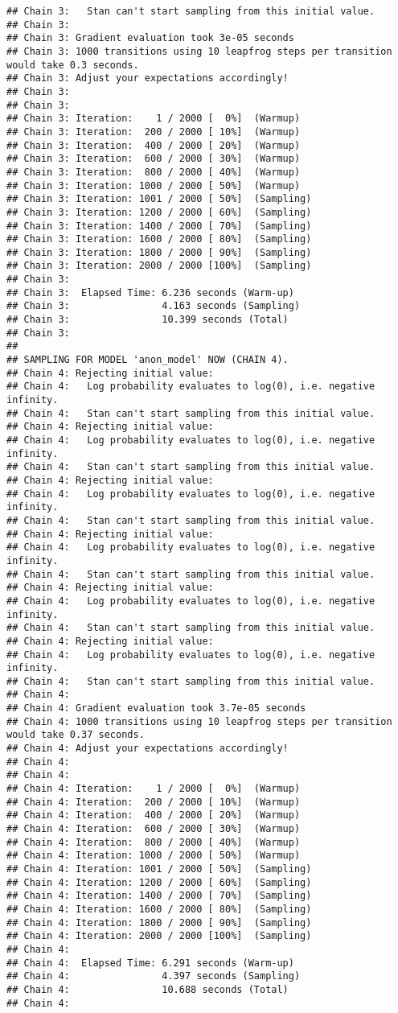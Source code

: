 \documentclass[
]{article}
\begin{document}
\begin{verbatim}
## Chain 3:   Stan can't start sampling from this initial value.
## Chain 3: 
## Chain 3: Gradient evaluation took 3e-05 seconds
## Chain 3: 1000 transitions using 10 leapfrog steps per transition would take 0.3 seconds.
## Chain 3: Adjust your expectations accordingly!
## Chain 3: 
## Chain 3: 
## Chain 3: Iteration:    1 / 2000 [  0%]  (Warmup)
## Chain 3: Iteration:  200 / 2000 [ 10%]  (Warmup)
## Chain 3: Iteration:  400 / 2000 [ 20%]  (Warmup)
## Chain 3: Iteration:  600 / 2000 [ 30%]  (Warmup)
## Chain 3: Iteration:  800 / 2000 [ 40%]  (Warmup)
## Chain 3: Iteration: 1000 / 2000 [ 50%]  (Warmup)
## Chain 3: Iteration: 1001 / 2000 [ 50%]  (Sampling)
## Chain 3: Iteration: 1200 / 2000 [ 60%]  (Sampling)
## Chain 3: Iteration: 1400 / 2000 [ 70%]  (Sampling)
## Chain 3: Iteration: 1600 / 2000 [ 80%]  (Sampling)
## Chain 3: Iteration: 1800 / 2000 [ 90%]  (Sampling)
## Chain 3: Iteration: 2000 / 2000 [100%]  (Sampling)
## Chain 3: 
## Chain 3:  Elapsed Time: 6.236 seconds (Warm-up)
## Chain 3:                4.163 seconds (Sampling)
## Chain 3:                10.399 seconds (Total)
## Chain 3: 
## 
## SAMPLING FOR MODEL 'anon_model' NOW (CHAIN 4).
## Chain 4: Rejecting initial value:
## Chain 4:   Log probability evaluates to log(0), i.e. negative infinity.
## Chain 4:   Stan can't start sampling from this initial value.
## Chain 4: Rejecting initial value:
## Chain 4:   Log probability evaluates to log(0), i.e. negative infinity.
## Chain 4:   Stan can't start sampling from this initial value.
## Chain 4: Rejecting initial value:
## Chain 4:   Log probability evaluates to log(0), i.e. negative infinity.
## Chain 4:   Stan can't start sampling from this initial value.
## Chain 4: Rejecting initial value:
## Chain 4:   Log probability evaluates to log(0), i.e. negative infinity.
## Chain 4:   Stan can't start sampling from this initial value.
## Chain 4: Rejecting initial value:
## Chain 4:   Log probability evaluates to log(0), i.e. negative infinity.
## Chain 4:   Stan can't start sampling from this initial value.
## Chain 4: Rejecting initial value:
## Chain 4:   Log probability evaluates to log(0), i.e. negative infinity.
## Chain 4:   Stan can't start sampling from this initial value.
## Chain 4: 
## Chain 4: Gradient evaluation took 3.7e-05 seconds
## Chain 4: 1000 transitions using 10 leapfrog steps per transition would take 0.37 seconds.
## Chain 4: Adjust your expectations accordingly!
## Chain 4: 
## Chain 4: 
## Chain 4: Iteration:    1 / 2000 [  0%]  (Warmup)
## Chain 4: Iteration:  200 / 2000 [ 10%]  (Warmup)
## Chain 4: Iteration:  400 / 2000 [ 20%]  (Warmup)
## Chain 4: Iteration:  600 / 2000 [ 30%]  (Warmup)
## Chain 4: Iteration:  800 / 2000 [ 40%]  (Warmup)
## Chain 4: Iteration: 1000 / 2000 [ 50%]  (Warmup)
## Chain 4: Iteration: 1001 / 2000 [ 50%]  (Sampling)
## Chain 4: Iteration: 1200 / 2000 [ 60%]  (Sampling)
## Chain 4: Iteration: 1400 / 2000 [ 70%]  (Sampling)
## Chain 4: Iteration: 1600 / 2000 [ 80%]  (Sampling)
## Chain 4: Iteration: 1800 / 2000 [ 90%]  (Sampling)
## Chain 4: Iteration: 2000 / 2000 [100%]  (Sampling)
## Chain 4: 
## Chain 4:  Elapsed Time: 6.291 seconds (Warm-up)
## Chain 4:                4.397 seconds (Sampling)
## Chain 4:                10.688 seconds (Total)
## Chain 4:
\end{verbatim}
\end{document}

